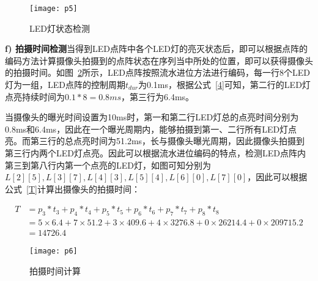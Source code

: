\begin{figure}[h] 
  \centering
  \texttt{[image: p5]}
  \caption{LED灯状态检测}
  \label{p5}
\end{figure}

\textbf{f) 拍摄时间检测}当得到LED点阵中各个LED灯的亮灭状态后，即可以根据点阵的编码方法计算摄像头拍摄到的点阵状态在序列当中所处的位置，即可以获得摄像头的拍摄时间。如图~\ref{p6}所示，LED点阵按照流水进位方法进行编码，每一行8个LED灯为一组，LED点阵的控制周期$t_{dur}$为0.1ms，根据公式~\ref{4}可知，第二行的LED灯点亮持续时间为$0.1 * 8 = 0.8ms$，第三行为6.4ms。

当摄像头的曝光时间设置为10ms时，第一和第二行LED灯总的点亮时间分别为0.8ms和6.4ms，因此在一个曝光周期内，能够拍摄到第一、二行所有LED灯点亮。而第三行的总点亮时间为51.2ms，长与摄像头曝光周期，因此摄像头拍摄到第三行内两个LED灯点亮。因此可以根据流水进位编码的特点，检测LED点阵内第三到第八行内第一个点亮的LED灯，如图可知分别为$L[2][5], L[3][7], L[4][3], L[5][4], L[6][0], L[7][0]$，因此可以根据公式~\ref{T}计算出摄像头的拍摄时间：

\begin{equation}
\begin{split}
T &= p_3 * t_3 +p_4 * t_4 +p_5 * t_5 +p_6 * t_6 +p_7 * t_7 +p_8 * t_8\\
&=5 \times 6.4 + 7 \times 51.2  +3\times 409.6 + 4\times3276.8  +0\times26214.4  +0\times209715.2\\
&=14726.4 
\end{split}
\end{equation}


\begin{figure}[h] 
  \centering
  \texttt{[image: p6]}
  \caption{拍摄时间计算}
  \label{p6}
\end{figure}

